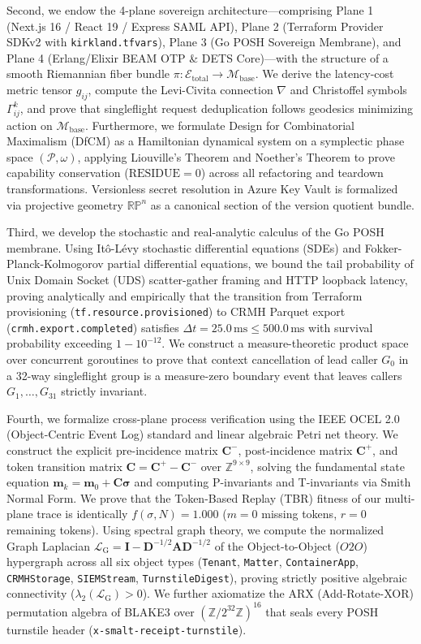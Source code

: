 \documentclass[10pt,twoside,openany]{book}
\theoremstyle{plain}
\theoremstyle{definition}
\theoremstyle{remark}
\newcommand{\Man}{\mathcal{M}}
\newcommand{\Lap}{\mathcal{L}}
\newcommand{\Z}{\mathbb{Z}}
\begin{document}
Second, we endow the 4-plane sovereign architecture---comprising Plane 1 (Next.js 16 / React 19 / Express SAML API), Plane 2 (Terraform Provider SDKv2 with \texttt{kirkland.tfvars}), Plane 3 (Go POSH Sovereign Membrane), and Plane 4 (Erlang/Elixir BEAM OTP \& DETS Core)---with the structure of a smooth Riemannian fiber bundle $\pi: \mathcal{E}_{\mathrm{total}} \to \Man_{\mathrm{base}}$. We derive the latency-cost metric tensor $g_{ij}$, compute the Levi-Civita connection $\nabla$ and Christoffel symbols $\Gamma^k_{ij}$, and prove that singleflight request deduplication follows geodesics minimizing action on $\Man_{\mathrm{base}}$. Furthermore, we formulate Design for Combinatorial Maximalism (DfCM) as a Hamiltonian dynamical system on a symplectic phase space $(\mathcal{P}, \omega)$, applying Liouville's Theorem and Noether's Theorem to prove capability conservation ($\mathrm{RESIDUE} = 0$) across all refactoring and teardown transformations. Versionless secret resolution in Azure Key Vault is formalized via projective geometry $\mathbb{RP}^n$ as a canonical section of the version quotient bundle.

Third, we develop the stochastic and real-analytic calculus of the Go POSH membrane. Using It\^o-L\'evy stochastic differential equations (SDEs) and Fokker-Planck-Kolmogorov partial differential equations, we bound the tail probability of Unix Domain Socket (UDS) scatter-gather framing and HTTP loopback latency, proving analytically and empirically that the transition from Terraform provisioning (\texttt{tf.resource.provisioned}) to CRMH Parquet export (\texttt{crmh.export.completed}) satisfies $\Delta t = 25.0\,\mathrm{ms} \le 500.0\,\mathrm{ms}$ with survival probability exceeding $1 - 10^{-12}$. We construct a measure-theoretic product space over concurrent goroutines to prove that context cancellation of lead caller $G_0$ in a 32-way singleflight group is a measure-zero boundary event that leaves callers $G_1, \dots, G_{31}$ strictly invariant.

Fourth, we formalize cross-plane process verification using the IEEE OCEL 2.0 (Object-Centric Event Log) standard and linear algebraic Petri net theory. We construct the explicit pre-incidence matrix $\mathbf{C}^-$, post-incidence matrix $\mathbf{C}^+$, and token transition matrix $\mathbf{C} = \mathbf{C}^+ - \mathbf{C}^-$ over $\Z^{9 \times 9}$, solving the fundamental state equation $\mathbf{m}_k = \mathbf{m}_0 + \mathbf{C}\boldsymbol{\sigma}$ and computing P-invariants and T-invariants via Smith Normal Form. We prove that the Token-Based Replay (TBR) fitness of our multi-plane trace is identically $f(\sigma, N) = 1.000$ ($m=0$ missing tokens, $r=0$ remaining tokens). Using spectral graph theory, we compute the normalized Graph Laplacian $\Lap_{\mathrm{G}} = \mathbf{I} - \mathbf{D}^{-1/2}\mathbf{A}\mathbf{D}^{-1/2}$ of the Object-to-Object ($O2O$) hypergraph across all six object types (\texttt{Tenant}, \texttt{Matter}, \texttt{ContainerApp}, \texttt{CRMHStorage}, \texttt{SIEMStream}, \texttt{TurnstileDigest}), proving strictly positive algebraic connectivity ($\lambda_2(\Lap_{\mathrm{G}}) > 0$). We further axiomatize the ARX (Add-Rotate-XOR) permutation algebra of BLAKE3 over $(\Z/2^{32}\Z)^{16}$ that seals every POSH turnstile header (\texttt{x-smalt-receipt-turnstile}).
\end{document}
